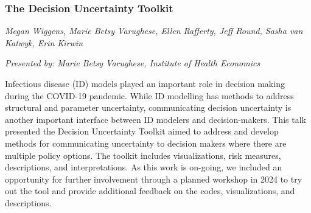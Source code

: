 \subsubsection*{The Decision Uncertainty Toolkit}

\textit{Megan Wiggens, Marie Betsy Varughese, Ellen Rafferty, Jeff Round, Sasha van Katwyk, Erin Kirwin}

\noindent \textit{Presented by: Marie Betsy Varughese, Institute of Health Economics}

Infectious disease (ID) models played an important role in decision
making during the COVID-19 pandemic. While ID modelling has methods to
address structural and parameter uncertainty, communicating decision
uncertainty is another important interface between ID modelers and
decision-makers. This talk presented the Decision Uncertainty Toolkit
aimed to address and develop methods for communicating uncertainty to
decision makers where there are multiple policy options. The toolkit
includes visualizations, risk measures, descriptions, and
interpretations.  As this work is on-going, we included an opportunity
for further involvement through a planned workshop in 2024 to try out
the tool and provide additional feedback on the codes, visualizations,
and descriptions.

